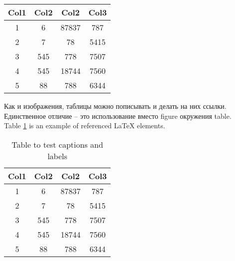 \documentclass[12pt]{article}        %
\begin{document}
\begin{center}
 \begin{tabular}{||c c | c c||} 
 \hline
 Col1 & Col2 & Col2 & Col3 \\ [0.5ex] 
 \hline\hline
 1 & 6 & 87837 & 787 \\ 
 \hline
 2 & 7 & 78 & 5415 \\
 \hline
 3 & 545 & 778 & 7507 \\
 \hline
 4 & 545 & 18744 & 7560 \\
 \hline
 5 & 88 & 788 & 6344 \\ [1ex] 
 \hline
\end{tabular}
\end{center}


Как и изображения, таблицы можно пописывать и делать на них ссылки. Единственное отличие – это использование вместо figure окружения table.\\
Table \ref{table:data} is an example of referenced \LaTeX{} elements.

\begin{table}[h!]
\centering
\begin{tabular}{|c|c|c|c|} 
 \hline
 Col1 & Col2 & Col2 & Col3 \\ [0.5ex] 
 \hline
 1 & 6 & 87837 & 787 \\ 
 2 & 7 & 78 & 5415 \\
 3 & 545 & 778 & 7507 \\
 4 & 545 & 18744 & 7560 \\
 5 & 88 & 788 & 6344 \\ [1ex] 
 \hline
\end{tabular}
\caption{Table to test captions and labels}
\label{table:data}
\end{table}
\end{document}
